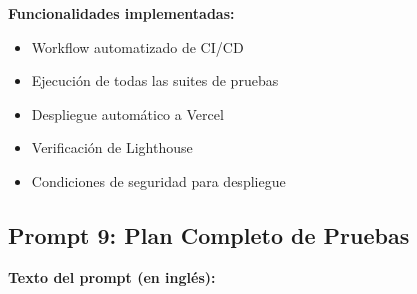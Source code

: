 \documentclass[12pt,a4paper]{article}
\begin{document}
\textbf{Funcionalidades implementadas:}
\begin{itemize}
    \item Workflow automatizado de CI/CD
    \item Ejecución de todas las suites de pruebas
    \item Despliegue automático a Vercel
    \item Verificación de Lighthouse
    \item Condiciones de seguridad para despliegue
\end{itemize}

\subsection{Prompt 9: Plan Completo de Pruebas}

\textbf{Texto del prompt (en inglés):}
\end{document}
